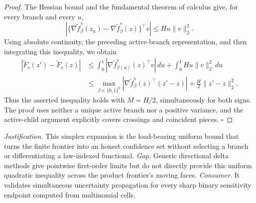 \documentclass{article}
\begin{document}
\begin{proof}
The Hessian bound and the fundamental theorem of calculus give, for every branch and every \(u\),
\[
 \left|
 \{\nabla\widetilde f_\beta^s(z_u)-\nabla\widetilde f_\beta^s(z)\}^\top v
 \right|
 \leq Hu\|v\|_2^2.
\]
Using absolute continuity, the preceding active-branch representation, and then integrating this inequality, we obtain
\[
 \begin{aligned}
 \left|\widetilde F_s(z')-\widetilde F_s(z)\right|
 &\leq
 \int_0^1
 \left|\nabla\widetilde f_{\beta(u)}^s(z)^\top v\right|\,du
 +\int_0^1Hu\|v\|_2^2\,du\\
 &\leq
 \max_{\beta\in\{0,1\}^6}
 \left|\nabla\widetilde f_\beta^s(z)^\top(z'-z)\right|
 +\frac H2\|z'-z\|_2^2.
 \end{aligned}
\]
Thus the asserted inequality holds with \(M=H/2\), simultaneously for both signs.  The proof uses neither a unique active branch nor a positive variance, and the active-child argument explicitly covers crossings and coincident pieces. \(\square\)
\end{proof}
\par\smallskip\noindent \textit{Justification.} This simplex expansion is the load-bearing uniform bound that turns the finite frontier into an honest confidence set without selecting a branch or differentiating a law-indexed functional. \textit{Gap.} Generic directional delta methods give pointwise first-order limits but do not directly provide this uniform quadratic inequality across the product frontier's moving faces. \textit{Consumer.} It validates simultaneous uncertainty propagation for every sharp binary sensitivity endpoint computed from multinomial cells.
\end{document}
